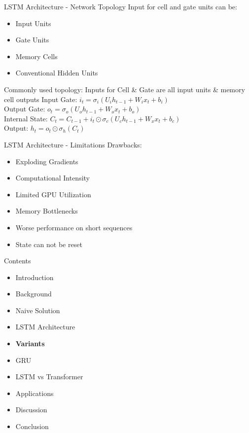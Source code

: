 \documentclass[10pt, aspectratio=169]{beamer}
\begin{document}
\begin{frame}[t]{LSTM Architecture - Network Topology}
Input for cell and gate units can be: \pause
\begin{itemize}
    \item Input Units \pause
    \item Gate Units \pause
    \item Memory Cells \pause
    \item Conventional Hidden Units \pause
\end{itemize}
Commonly used topology: Inputs for Cell \& Gate are all input units \& memory cell outputs \pause
Input Gate:  \begin{math}i_t=\sigma_i\left(U_{i}h_{t-1}+W_{i} x_t + b_i\right)\end{math}\pause\\
Output Gate: \begin{math}o_t=\sigma_o\left(U_{o}h_{t-1}+W_{o}x_t + b_o\right)\end{math}\pause\\
Internal State: \begin{math}C_t=C_{t-1}+i_t\odot\sigma_c\left(U_{c}h_{t-1}+W_{x}x_t + b_c\right)\end{math}\pause\\
Output: \begin{math}h_t=o_t\odot\sigma_h\left(C_t\right)\end{math}
\end{frame}

\begin{frame}[t]{LSTM Architecture - Limitations}
Drawbacks: \pause
\begin{itemize}
    \item Exploding Gradients \pause
    \item Computational Intensity \pause
    \item Limited GPU Utilization \pause
    \item Memory Bottlenecks \pause
    \item Worse performance on short sequences \pause
    \item State can not be reset \pause
\end{itemize}
\end{frame}

\begin{frame}[t]{Contents}
\begin{itemize}
    \item Introduction
    \item Background
    \item Naive Solution
    \item LSTM Architecture
    \item \textbf{Variants}
    \item GRU
    \item LSTM vs Transformer
    \item Applications
    \item Discussion
    \item Conclusion
\end{itemize}
\end{frame}
\end{document}
